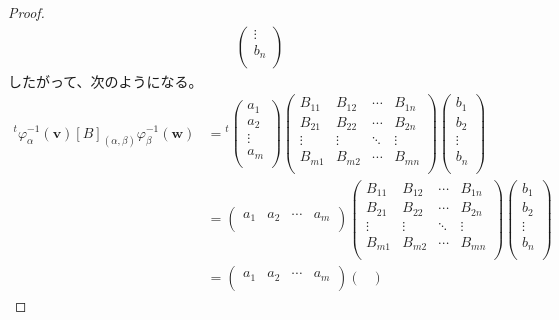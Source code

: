\documentclass[dvipdfmx]{jsarticle}
\begin{document}
\begin{proof}
\begin{align*}
\begin{pmatrix}
 \vdots \\
b_{n} \\
\end{pmatrix}
\end{align*}
したがって、次のようになる。
\begin{align*}
{}^{t}\varphi_{\alpha}^{- 1}\left( \mathbf{v} \right)[ B]_{(\alpha,\beta)}\varphi_{\beta}^{- 1}\left( \mathbf{w} \right) &={}^{t}\begin{pmatrix}
a_{1} \\
a_{2} \\
 \vdots \\
a_{m} \\
\end{pmatrix}\begin{pmatrix}
B_{11} & B_{12} & \cdots & B_{1n} \\
B_{21} & B_{22} & \cdots & B_{2n} \\
 \vdots & \vdots & \ddots & \vdots \\
B_{m1} & B_{m2} & \cdots & B_{mn} \\
\end{pmatrix}\begin{pmatrix}
b_{1} \\
b_{2} \\
 \vdots \\
b_{n} \\
\end{pmatrix}\\
&= \begin{pmatrix}
a_{1} & a_{2} & \cdots & a_{m} \\
\end{pmatrix}\begin{pmatrix}
B_{11} & B_{12} & \cdots & B_{1n} \\
B_{21} & B_{22} & \cdots & B_{2n} \\
 \vdots & \vdots & \ddots & \vdots \\
B_{m1} & B_{m2} & \cdots & B_{mn} \\
\end{pmatrix}\begin{pmatrix}
b_{1} \\
b_{2} \\
 \vdots \\
b_{n} \\
\end{pmatrix}\\
&= \begin{pmatrix}
a_{1} & a_{2} & \cdots & a_{m} \\
\end{pmatrix}\begin{pmatrix}

\end{pmatrix}
\end{align*}
\end{proof}
\end{document}
